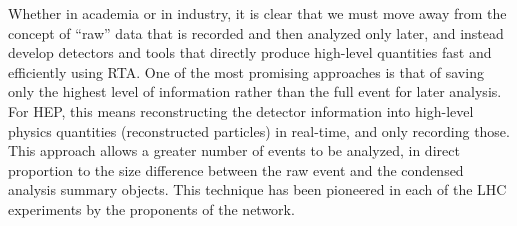 Whether in academia or in industry, it is clear that we must move away from the concept of 
``raw'' data that is recorded and then analyzed only later, and instead develop detectors and tools that 
directly produce high-level quantities 
fast and efficiently using RTA. One of the most promising approaches is that of 
saving only the highest level of information rather than the full event for later analysis. 
For HEP, this means reconstructing the detector information into high-level physics quantities 
(reconstructed particles) in real-time, and only recording those.
This approach
allows a greater number of events to be analyzed,
in direct proportion to the size difference between the raw event and the condensed analysis summary objects.
This technique has been pioneered in each of the LHC experiments by the proponents of the \acronym network. 

